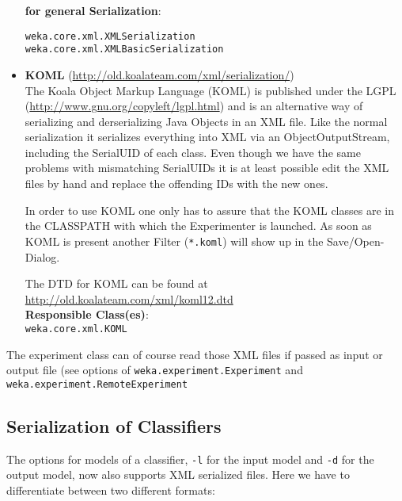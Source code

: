 \begin{itemize}
\noindent \textbf{for general Serialization}:

\begin{verbatim}
weka.core.xml.XMLSerialization
weka.core.xml.XMLBasicSerialization 
\end{verbatim}

\newpage
\item \textbf{KOML} (\url{http://old.koalateam.com/xml/serialization/}{})\\
The Koala Object Markup Language (KOML) is published under the LGPL
(\url{http://www.gnu.org/copyleft/lgpl.html}{}) and is an alternative way of
serializing and derserializing Java Objects in an XML file. Like the
normal serialization it serializes everything into XML via an
ObjectOutputStream, including the SerialUID of each class. Even though
we have the same problems with mismatching SerialUIDs it is at least
possible edit the XML files by hand and replace the offending IDs with
the new ones.

In order to use KOML one only has to assure that the KOML classes are
in the CLASSPATH with which the Experimenter is launched. As soon as
KOML is present another Filter (\verb=*.koml=) will show up in the
Save/Open-Dialog.

The DTD for KOML can be found at \url{http://old.koalateam.com/xml/koml12.dtd}{}\\

\noindent \textbf{Responsible Class(es)}:\\

\verb=weka.core.xml.KOML=\\
\end{itemize}

\noindent The experiment class can of course read those XML files if passed as
input or output file (see options of \verb=weka.experiment.Experiment= and
\verb=weka.experiment.RemoteExperiment=

\subsection{Serialization of Classifiers}
The options for models of a classifier, \verb=-l= for the input model and \verb=-d=
for the output model, now also supports XML serialized files. Here we
have to differentiate between two different formats:

